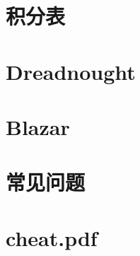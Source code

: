 \documentclass[a4paper,9]{article}
\begin{document}
\section{积分表}

\section{Dreadnought}

\section{Blazar}

\section{常见问题}

\section{cheat.pdf}
\newpage
\noindent

\end{document}
